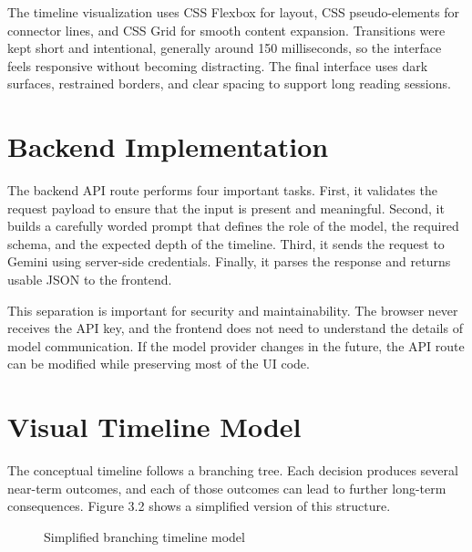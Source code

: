 \documentclass[12pt,a4paper]{report}
\begin{document}
The timeline visualization uses CSS Flexbox for layout, CSS pseudo-elements for connector lines, and CSS Grid for smooth content expansion. Transitions were kept short and intentional, generally around 150 milliseconds, so the interface feels responsive without becoming distracting. The final interface uses dark surfaces, restrained borders, and clear spacing to support long reading sessions.

\section{Backend Implementation}
The backend API route performs four important tasks. First, it validates the request payload to ensure that the input is present and meaningful. Second, it builds a carefully worded prompt that defines the role of the model, the required schema, and the expected depth of the timeline. Third, it sends the request to Gemini using server-side credentials. Finally, it parses the response and returns usable JSON to the frontend.

This separation is important for security and maintainability. The browser never receives the API key, and the frontend does not need to understand the details of model communication. If the model provider changes in the future, the API route can be modified while preserving most of the UI code.

\section{Visual Timeline Model}
The conceptual timeline follows a branching tree. Each decision produces several near-term outcomes, and each of those outcomes can lead to further long-term consequences. Figure 3.2 shows a simplified version of this structure.

\begin{figure}[h]
    \centering
    \caption{Simplified branching timeline model}
\end{figure}
\end{document}
